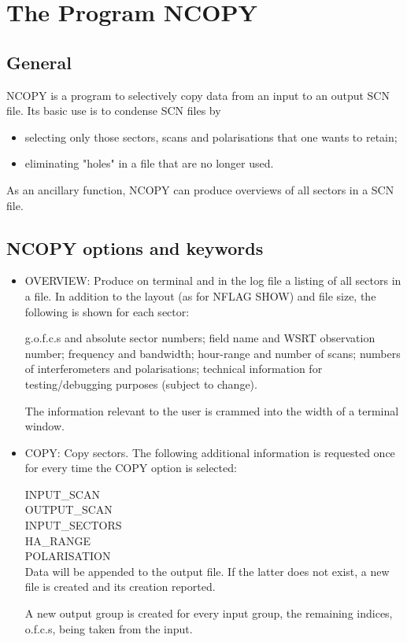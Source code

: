 %
%

%
\chapter{The Program NCOPY}
\tableofcontents 

\section{General}

	NCOPY is a program to selectively copy data from an input to an
output SCN file. Its basic use is to condense SCN files by
\begin{itemize}

\item   selecting only those sectors, scans and polarisations that one wants
to retain;

\item   eliminating "holes" in a file that are no longer used.
\end{itemize}
As an ancillary function, NCOPY can produce overviews of all sectors in a SCN
file.



\section{NCOPY options and keywords}
\begin{itemize}
\item   OVERVIEW: Produce on terminal and in the log file a listing of all
sectors in a file. In addition to the layout (as for NFLAG SHOW) and file
size, the following is shown for each sector:

                {\sf g.o.f.c.s} and absolute sector numbers;
                field name and WSRT observation number;
                frequency and bandwidth;
                hour-range and number of scans;
                numbers of interferometers and polarisations;
                technical information for testing/debugging purposes (subject
to change).

The information relevant to the user is crammed into the width of a terminal
window.

\item   COPY: Copy sectors. The following additional information is requested
once for every time the COPY option is selected:

\indent       INPUT\_SCAN \\
\indent       OUTPUT\_SCAN \\
\indent       INPUT\_SECTORS \\
\indent       HA\_RANGE \\
\indent       POLARISATION \\

	Data will be appended to the output file. If the latter does not
exist, a new file is created and its creation reported.

	A new output group is created for every input group, the
remaining indices, o.f.c.s, being taken from the input.
\end{itemize}


